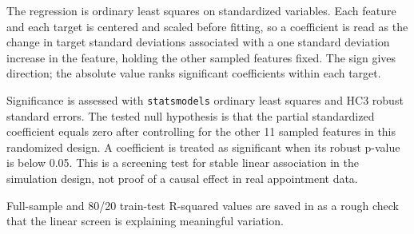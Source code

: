 \documentclass[11pt]{article}
\begin{document}
The regression is ordinary least squares on standardized variables. Each feature
and each target is centered and scaled before fitting, so a coefficient is read
as the change in target standard deviations associated with a one standard
deviation increase in the feature, holding the other sampled features fixed. The
sign gives direction; the absolute value ranks significant coefficients within
each target.

Significance is assessed with \texttt{statsmodels} ordinary least squares and
HC3 robust standard errors. The tested null hypothesis is that the partial
standardized coefficient equals zero after controlling for the other 11 sampled
features in this randomized design. A coefficient is treated as significant when
its robust p-value is below 0.05. This is a screening test for stable linear
association in the simulation design, not proof of a causal effect in real
appointment data.

Full-sample and 80/20 train-test R-squared values are saved in
 as
a rough check that the linear screen is explaining meaningful variation.
\end{document}
